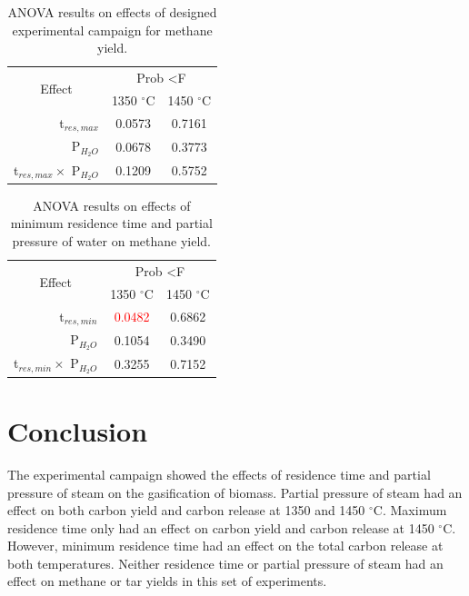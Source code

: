 \documentclass[11pt,twocolumn]{article}
\begin{document}
\begin{table}
	\centering
	\caption{ANOVA results on effects of designed experimental campaign for methane yield.}
	\begin{tabular}{r c c}
		\toprule
		\multicolumn{1}{c}{\multirow{2}{*}{Effect}}		& 	\multicolumn{2}{c}{Prob \textless F	}	\\
		{}								&	1350 $^\circ$C					&	1450 $^\circ$C		\\
		\midrule
		t$_{res,max}$						&	0.0573						&	0.7161			\\
		P$_{H_2O}$						&	0.0678						&	0.3773			\\
		t$_{res,max}\times$ P$_{H_2O}$		&	0.1209						&	0.5752			\\
		\bottomrule
	\end{tabular}
	\label{anova_ch4}
\end{table}

\begin{table}
	\centering
	\caption{ANOVA results on effects of minimum residence time and partial pressure of water on methane yield.}
	\begin{tabular}{r c c}
		\toprule
		\multicolumn{1}{c}{\multirow{2}{*}{Effect}}		& 	\multicolumn{2}{c}{Prob \textless F	}	\\
		{}								&	1350 $^\circ$C					&	1450 $^\circ$C		\\
		\midrule
		t$_{res,min}$						&	\textcolor{red}{0.0482}		&	0.6862			\\
		P$_{H_2O}$						&	0.1054					&	0.3490			\\
		t$_{res,min}\times$ P$_{H_2O}$		&	0.3255					&	0.7152			\\
		\bottomrule
	\end{tabular}
	\label{anova_ch4_tmin}
\end{table}

\section*{Conclusion}

The experimental campaign showed the effects of residence time and partial pressure of steam on the gasification of biomass.  Partial pressure of steam had an effect on both carbon yield and carbon release at 1350 and 1450 $^\circ$C.  Maximum residence time only had an effect on carbon yield and carbon release at 1450 $^\circ$C.  However, minimum residence time had an effect on the total carbon release at both temperatures.  Neither residence time or partial pressure of steam had an effect on methane or tar yields in this set of experiments.
\balance
\end{document}
